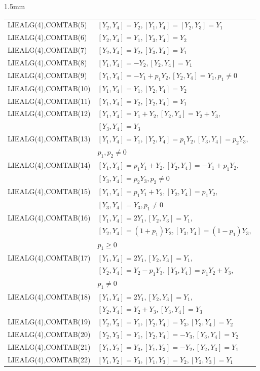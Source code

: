 \begin{setlength}{\extrarowheight}{1.5mm}
\begin{longtable}{l|l}
{LIEALG(4),COMTAB(5)}&$[Y_2,Y_4]=Y_2,[Y_1,Y_4]=[Y_2,Y_3]=Y_1$\\
{LIEALG(4),COMTAB(6)}&$[Y_2,Y_4]=Y_1,[Y_3,Y_4]=Y_2$\\
{LIEALG(4),COMTAB(7)}&$[Y_2,Y_4]=Y_2,[Y_3,Y_4]=Y_1$\\
{LIEALG(4),COMTAB(8)}&$[Y_1,Y_4]=-Y_2,[Y_2,Y_4]=Y_1$\\
{LIEALG(4),COMTAB(9)}&$[Y_1,Y_4]=-Y_1+p_1 Y_2,[Y_2,Y_4]=Y_1,p_1\neq 0$\\
{LIEALG(4),COMTAB(10)}&$[Y_1,Y_4]=Y_1,[Y_2,Y_4]=Y_2$\\
{LIEALG(4),COMTAB(11)}&$[Y_1,Y_4]=Y_2,[Y_2,Y_4]=Y_1$ \\
{LIEALG(4),COMTAB(12)}&$[Y_1,Y_4]=Y_1+Y_2,[Y_2,Y_4]=Y_2+Y_3,$\\
                      &$[Y_3,Y_4]=Y_3$\\
{LIEALG(4),COMTAB(13)}&$[Y_1,Y_4]=Y_1,[Y_2,Y_4]=p_1 Y_2,[Y_3,Y_4]=p_2 Y_3,$\\
                      &$p_1,p_2\neq 0$\\
{LIEALG(4),COMTAB(14)}&$[Y_1,Y_4]=p_1 Y_1+Y_2,[Y_2,Y_4]=-Y_1+p_1 Y_2,$\\
                      &$[Y_3,Y_4]=p_2 Y_3,p_2\neq 0$\\
{LIEALG(4),COMTAB(15)}&$[Y_1,Y_4]=p_1 Y_1+Y_2,[Y_2,Y_4]=p_1 Y_2,$\\
                      &$[Y_3,Y_4]=Y_3,p_1\neq 0$\\
{LIEALG(4),COMTAB(16)}&$[Y_1,Y_4]=2 Y_1,[Y_2,Y_3]=Y_1,$\\
                      &$[Y_2,Y_4]=(1+p_1) Y_2,[Y_3,Y_4]=(1-p_1) Y_3,$\\
                      &$p_1\geq 0$\\
{LIEALG(4),COMTAB(17)}&$[Y_1,Y_4]=2 Y_1,[Y_2,Y_3]=Y_1,$\\
                      &$[Y_2,Y_4]=Y_2-p_1 Y_3,[Y_3,Y_4]=p_1 Y_2+Y_3,$\\
                      &$p_1\neq 0$\\
{LIEALG(4),COMTAB(18)}&$[Y_1,Y_4]=2 Y_1,[Y_2,Y_3]=Y_1,$\\
                      &$[Y_2,Y_4]=Y_2+Y_3,[Y_3,Y_4]=Y_3$\\
{LIEALG(4),COMTAB(19)}&$[Y_2,Y_3]=Y_1,[Y_2,Y_4]=Y_3,[Y_3,Y_4]=Y_2$\\
{LIEALG(4),COMTAB(20)}&$[Y_2,Y_3]=Y_1,[Y_2,Y_4]=-Y_3,[Y_3,Y_4]=Y_2$\\
{LIEALG(4),COMTAB(21)}&$[Y_1,Y_2]=Y_3,[Y_1,Y_3]=-Y_2,[Y_2,Y_3]=Y_1$\\
{LIEALG(4),COMTAB(22)}&$[Y_1,Y_2]=Y_3,[Y_1,Y_3]=Y_2,[Y_2,Y_3]=Y_1$
\end{longtable}
\end{setlength}